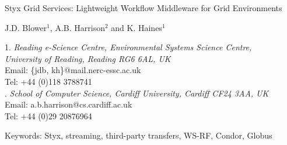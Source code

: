 \documentclass[a4paper]{article}
\begin{document}
\doublespacing

\begin{center}
{\Large Styx Grid Services: Lightweight Workflow Middleware for Grid Environments}

\bigskip
\bigskip

{\large J.D. Blower$^{1}$, A.B. Harrison$^{2}$ and K. Haines$^{1}$}

\bigskip

{\small 1. \textit{Reading e-Science Centre, Environmental Systems Science Centre, \\
University of Reading, Reading RG6 6AL, UK} \\
Email: \{jdb, kh\}@mail.nerc-essc.ac.uk\\
Tel: +44 (0)118 3788741 \\
. \textit{School of Computer Science, Cardiff University, Cardiff CF24 3AA, UK}\\
Email: a.b.harrison@cs.cardiff.ac.uk\\
Tel: +44 (0)29 20876964}

\bigskip
\bigskip

Keywords: Styx, streaming, third-party transfers, WS-RF, Condor, Globus

\end{center}

\newpage

\begin{abstract}
The service-oriented approach to performing distributed scientific research is potentially very powerful but is not yet widely used in many scientific fields.  This is partly due to the technical difficulties involved in creating services and composing them into workflows and the inefficiency of many workflow systems with regard to handling large datasets.  We present the Styx Grid Service, a simple system that wraps command-line programs and allows them to be run over the Internet exactly as if they were local programs.  Styx Grid Services are very easy to create and use and can be composed into powerful workflows with simple shell scripts or more sophisticated graphical tools.  An important feature of the system is that data can be streamed directly from service to service, significantly increasing the efficiency of workflows that use large data volumes.  The status and progress of Styx Grid Services can be monitored asynchronously using a mechanism that places very few demands on firewalls.  Styx Grid Services can interoperate with with Web Services and WS-Resources using suitable wrappers and brokers.
\end{abstract}
\end{document}
